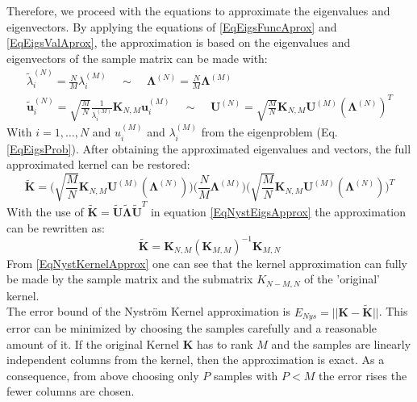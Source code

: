 Therefore, we proceed with the equations to approximate the eigenvalues and eigenvectors.
By applying the equations of \eqref{EqEigsFuncAprox} and \eqref{EqEigsValAprox}, the approximation is based on the eigenvalues and eigenvectors of the sample matrix can be made with:\cite{Zhang.2008}
\begin{equation}\label{EqNystEigsApprox}
	\begin{gathered}
			\tilde{\lambda}_i^{(N)} = \frac{N}{M}\lambda_i^{(M)} \>\>\>\>\> \sim \>\>\>\>\> \boldsymbol{\Lambda}^{(N)} =\frac{N}{M}\boldsymbol{\Lambda}^{(M)}\\
			\tilde{\mathbf{u}}_i^{(N)} = \sqrt{\frac{M}{N}}\frac{1}{\lambda_i^{(M)}}\mathbf{K}_{N,M}\mathbf{u}_i^{(M)}\>\>\>\>\> \sim \>\>\>\>\> \mathbf{U}^{(N)} = \sqrt{\frac{M}{N}}\mathbf{K}_{N,M}\mathbf{U}^{(M)}(\boldsymbol{\Lambda}^{(N)})^T
	\end{gathered}
\end{equation}
With $i=1,\dots,N$ and $u_i^{(M)}$ and $\lambda_i^{(M)}$ from the eigenproblem (Eq. \eqref{EqEigsProb}).
After obtaining the approximated eigenvalues and vectors, the full approximated kernel can be restored:\cite{Williams.2000}\cite{Zhang.2008}
\begin{equation}\label{EqNystKernelEigsApprox}
	\tilde{\mathbf{K}} = \bigg(\sqrt{\frac{M}{N}}\mathbf{K}_{N,M}\mathbf{U}^{(M)}(\boldsymbol{\Lambda}^{(N)})\bigg)\bigg(\frac{N}{M}\boldsymbol{\Lambda}^{(M)}\bigg)\bigg(\sqrt{\frac{M}{N}}\mathbf{K}_{N,M}\mathbf{U}^{(M)}(\boldsymbol{\Lambda}^{(N)})\bigg)^T 
\end{equation}
With the use of $\tilde{\mathbf{K}} = \tilde{\mathbf{U}}\tilde{\mathbf{\Lambda}}\tilde{\mathbf{U}}^T$ in equation \eqref{EqNystEigsApprox} the approximation can be rewritten as:
\begin{equation}\label{EqNystKernelApprox}
		\tilde{\mathbf{K}} = \mathbf{K}_{N,M}(\mathbf{K}_{M,M})^{-1}\mathbf{K}_{M,N}
\end{equation}
From \eqref{EqNystKernelApprox} one can see that the kernel approximation can fully be made by the sample matrix and the submatrix $K_{N-M, N}$ of the 'original' kernel.\cite{Williams.2000}\\
The error bound of the Nyström Kernel approximation is $E_{Nys}=||\mathbf{K}-\tilde{\mathbf{K}}||$.\cite{He.2017}
This error can be minimized by choosing the samples carefully and a reasonable amount of it.
If the original Kernel $\mathbf{K}$ has to rank $M$ and the samples are linearly independent columns from the kernel, then the approximation is exact.
As a consequence, from above choosing only $P$ samples with $P< M$ the error rises the fewer columns are chosen.\cite{Williams.2000}\\
